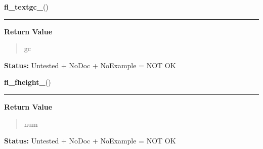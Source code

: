     \label{xformslib:library:fl_textgc_}

    \vspace{0.5ex}

\hspace{.8\funcindent}\begin{boxedminipage}{\funcwidth}

    \raggedright \textbf{fl\_textgc\_}()

    \vspace{-1.5ex}

    \rule{\textwidth}{0.5\fboxrule}
\setlength{\parskip}{2ex}
\setlength{\parskip}{1ex}
      \textbf{Return Value}
    \vspace{-1ex}

      \begin{quote}
      gc

      \end{quote}

\textbf{Status:} Untested + NoDoc + NoExample = NOT OK



    \end{boxedminipage}

    \label{xformslib:library:fl_fheight_}

    \vspace{0.5ex}

\hspace{.8\funcindent}\begin{boxedminipage}{\funcwidth}

    \raggedright \textbf{fl\_fheight\_}()

    \vspace{-1.5ex}

    \rule{\textwidth}{0.5\fboxrule}
\setlength{\parskip}{2ex}
\setlength{\parskip}{1ex}
      \textbf{Return Value}
    \vspace{-1ex}

      \begin{quote}
      num

      \end{quote}

\textbf{Status:} Untested + NoDoc + NoExample = NOT OK



    \end{boxedminipage}

